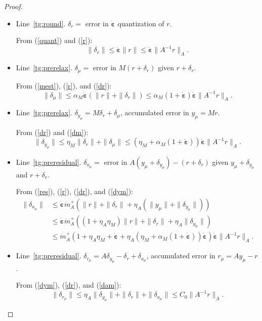 \documentclass[onefignum,onetabnum]{siamart220329}
\newcommand{\ewed}{\boldsymbol{\dot{\varepsilon}}}
\newcommand{\aladot}{{\dot{m}}_A^+}
\begin{document}
{\begin{proof}
\begin{itemize}
\item Line~\ref{tg:round}. $\delta_r =$ error in $\ewed$ quantization of $r$.

From (\ref{quant}) and (\ref{r}):
\begin{equation}
\|\delta_r\| \le \ewed \|r\| \le \ewed \|A^{-1}r\|_A .
\label{dr}
\end{equation}

\item Line~\ref{tg:prerelax}. $\delta_\mu =$ error in  $M(r + \delta_r)$ given $r + \delta_r$.

From (\ref{mest}), (\ref{r}), and (\ref{dr}):
\begin{equation}
\|\delta_\mu\| \le \alpha_M \ewed (\|r\| + \|\delta_r\|) \le \alpha_M  (1 + \ewed) \ewed \|A^{-1}r\|_A .
\label{dm}
\end{equation}

\item Line~\ref{tg:prerelax}. $\delta_{y_{\mu}} = M \delta_r + \delta_\mu$, accumulated error in  $y_\mu = M r$.

From (\ref{dr}) and (\ref{dm}):
\begin{equation}
\|\delta_{y_\mu}\| \le \eta_M \|\delta_r\| + \|\delta_\mu\| \le (\eta_M + \alpha_M  (1 + \ewed)) \ewed \|A^{-1}r\|_A .
\label{dym}
\end{equation}

\item Line~\ref{tg:preresidual}. $\delta_{a_\mu} =$ error in  $A (y_\mu + \delta_{y_\mu}) - (r + \delta_r)$ given $y_\mu + \delta_{y_\mu}$ and $r + \delta_r$.

From (\ref{res}), (\ref{r}), (\ref{dr}), and (\ref{dym}):
\begin{align}
\label{dam}
\|\delta_{a_\mu}\| &\le \ewed \aladot (\|r\| + \|\delta_r\| + \eta_A (\|y_\mu\| + \|\delta_{y_\mu}\|)) \\
&\le \ewed \aladot ((1 + \eta_A \eta_M) \|r\| + \|\delta_r\| + \eta_A \|\delta_{y_\mu}\|) \nonumber \\
&\le \aladot (1 + \eta_A \eta_M + \ewed + \eta_A (\eta_M + \alpha_M  (1 + \ewed)) \ewed) \ewed \|A^{-1}r\|_A \nonumber .
\end{align}

\item Line~\ref{tg:preresidual}. $\delta_{r_{\mu}} = A \delta_{y_\mu} - \delta_r + \delta_{a_\mu}$, accumulated error in  $r_\mu = A y_\mu - r$.

From (\ref{dym}), (\ref{dr}), and (\ref{dam}):
\begin{equation}
\|\delta_{r_{\mu}}\| \le \eta_A \|\delta_{y_\mu}\| + \|\delta_r\| + \|\delta_{a_\mu}\| 
\le C_0 \|A^{-1}r\|_A .
\label{drm}
\end{equation}


\end{itemize}
\end{proof}}
\end{document}
